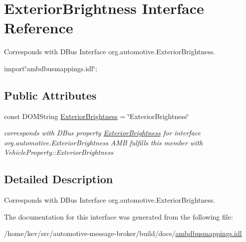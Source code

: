 \hypertarget{interfaceExteriorBrightness}{\section{Exterior\+Brightness Interface Reference}
\label{interfaceExteriorBrightness}
}


Corresponds with D\+Bus Interface org.\+automotive.\+Exterior\+Brightness.  




{\ttfamily import\char`\"{}ambdbusmappings.\+idl\char`\"{};}

\subsection*{Public Attributes}
\begin{DoxyCompactItemize}
\item 
\hypertarget{interfaceExteriorBrightness_aee82775a15fc8ef0ddc7de078871921f}{const D\+O\+M\+String \hyperlink{interfaceExteriorBrightness_aee82775a15fc8ef0ddc7de078871921f}{Exterior\+Brightness} = \char`\"{}Exterior\+Brightness\char`\"{}}\label{interfaceExteriorBrightness_aee82775a15fc8ef0ddc7de078871921f}

\begin{DoxyCompactList}\small\item\em corresponds with D\+Bus property \hyperlink{interfaceExteriorBrightness}{Exterior\+Brightness} for interface org.\+automotive.\+Exterior\+Brightness A\+M\+B fulfills this member with Vehicle\+Property\+::\+Exterior\+Brightness \end{DoxyCompactList}\end{DoxyCompactItemize}


\subsection{Detailed Description}
Corresponds with D\+Bus Interface org.\+automotive.\+Exterior\+Brightness. 

The documentation for this interface was generated from the following file\+:\begin{DoxyCompactItemize}
\item 
/home/kev/src/automotive-\/message-\/broker/build/docs/\hyperlink{ambdbusmappings_8idl}{ambdbusmappings.\+idl}\end{DoxyCompactItemize}
